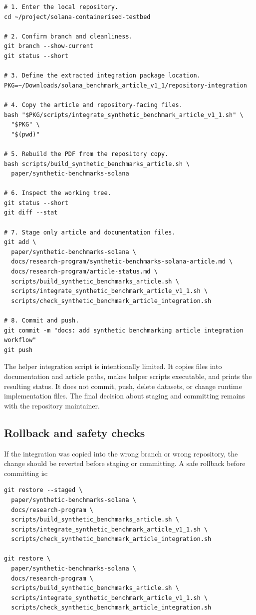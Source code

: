 \documentclass[11pt,a4paper]{article}
\begin{document}
\begin{verbatim}
# 1. Enter the local repository.
cd ~/project/solana-containerised-testbed

# 2. Confirm branch and cleanliness.
git branch --show-current
git status --short

# 3. Define the extracted integration package location.
PKG=~/Downloads/solana_benchmark_article_v1_1/repository-integration

# 4. Copy the article and repository-facing files.
bash "$PKG/scripts/integrate_synthetic_benchmark_article_v1_1.sh" \
  "$PKG" \
  "$(pwd)"

# 5. Rebuild the PDF from the repository copy.
bash scripts/build_synthetic_benchmarks_article.sh \
  paper/synthetic-benchmarks-solana

# 6. Inspect the working tree.
git status --short
git diff --stat

# 7. Stage only article and documentation files.
git add \
  paper/synthetic-benchmarks-solana \
  docs/research-program/synthetic-benchmarks-solana-article.md \
  docs/research-program/article-status.md \
  scripts/build_synthetic_benchmarks_article.sh \
  scripts/integrate_synthetic_benchmark_article_v1_1.sh \
  scripts/check_synthetic_benchmark_article_integration.sh

# 8. Commit and push.
git commit -m "docs: add synthetic benchmarking article integration workflow"
git push
\end{verbatim}

The helper integration script is intentionally limited. It copies files into documentation and article paths, makes helper scripts executable, and prints the resulting status. It does not commit, push, delete datasets, or change runtime implementation files. The final decision about staging and committing remains with the repository maintainer.

\subsection{Rollback and safety checks}
\label{subsec:github-rollback}

If the integration was copied into the wrong branch or wrong repository, the change should be reverted before staging or committing. A safe rollback before committing is:

\begin{verbatim}
git restore --staged \
  paper/synthetic-benchmarks-solana \
  docs/research-program \
  scripts/build_synthetic_benchmarks_article.sh \
  scripts/integrate_synthetic_benchmark_article_v1_1.sh \
  scripts/check_synthetic_benchmark_article_integration.sh

git restore \
  paper/synthetic-benchmarks-solana \
  docs/research-program \
  scripts/build_synthetic_benchmarks_article.sh \
  scripts/integrate_synthetic_benchmark_article_v1_1.sh \
  scripts/check_synthetic_benchmark_article_integration.sh
\end{verbatim}
\end{document}

